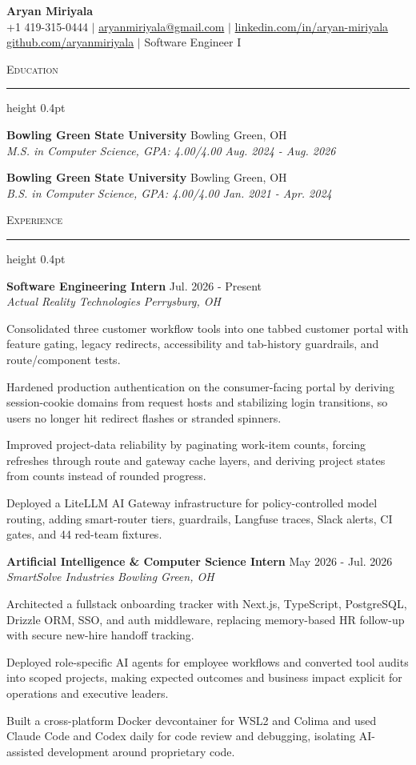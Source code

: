 \documentclass[letterpaper,11pt]{article}
\newcommand{\resumesection}[1]{%
  \par\vspace{2pt}%
  {\large\scshape #1}\par\vspace{2pt}%
  \hrule height 0.4pt\vspace{2pt}%
}
\newcommand{\resumeSubheading}[4]{
  \textbf{#1} \hfill #2\\
  \textit{#3} \hfill \textit{#4}
}
\begin{document}
\begin{center}
  {\LARGE \textbf{Aryan Miriyala}}\\[2pt]
  \small
  +1 419-315-0444 $|$ \href{mailto:aryanmiriyala@gmail.com}{aryanmiriyala@gmail.com} $|$ \href{https://www.linkedin.com/in/aryan-miriyala-7788a21b6/}{linkedin.com/in/aryan-miriyala}\\
  \href{https://github.com/aryanmiriyala}{github.com/aryanmiriyala} $|$ Software Engineer I
\end{center}\vspace{-6pt}

\resumesection{Education}
\resumeSubheading
{Bowling Green State University}{Bowling Green, OH}
{M.S. in Computer Science, GPA: 4.00/4.00}{Aug. 2024 - Aug. 2026}

\resumeSubheading
{Bowling Green State University}{Bowling Green, OH}
{B.S. in Computer Science, GPA: 4.00/4.00}{Jan. 2021 - Apr. 2024}

\resumesection{Experience}
\resumeSubheading
{Software Engineering Intern}{Jul. 2026 - Present}
{Actual Reality Technologies}{Perrysburg, OH}
\begin{tightitemize}
  \item Consolidated three customer workflow tools into one tabbed customer portal with feature gating, legacy redirects, accessibility and tab-history guardrails, and route/component tests.
  \item Hardened production authentication on the consumer-facing portal by deriving session-cookie domains from request hosts and stabilizing login transitions, so users no longer hit redirect flashes or stranded spinners.
  \item Improved project-data reliability by paginating work-item counts, forcing refreshes through route and gateway cache layers, and deriving project states from counts instead of rounded progress.
  \item Deployed a LiteLLM AI Gateway infrastructure for policy-controlled model routing, adding smart-router tiers, guardrails, Langfuse traces, Slack alerts, CI gates, and 44 red-team fixtures.
\end{tightitemize}

\resumeSubheading
{Artificial Intelligence \& Computer Science Intern}{May 2026 - Jul. 2026}
{SmartSolve Industries}{Bowling Green, OH}
\begin{tightitemize}
  \item Architected a fullstack onboarding tracker with Next.js, TypeScript, PostgreSQL, Drizzle ORM, SSO, and auth middleware, replacing memory-based HR follow-up with secure new-hire handoff tracking.
  \item Deployed role-specific AI agents for employee workflows and converted tool audits into scoped projects, making expected outcomes and business impact explicit for operations and executive leaders.
  \item Built a cross-platform Docker devcontainer for WSL2 and Colima and used Claude Code and Codex daily for code review and debugging, isolating AI-assisted development around proprietary code.
\end{tightitemize}
\end{document}
